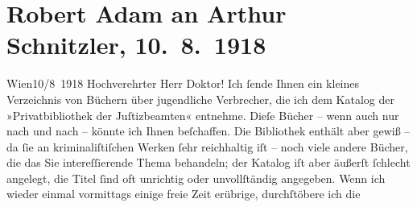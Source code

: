 

         
         \renewcommand{\erwaehntePersonen}{Personen: Robert Adam}
         \renewcommand{\erwaehnteInstitutionen}{Institutionen: Privatbibliothek der Wiener Justizbeamten}
         \renewcommand{\erwaehnteOrte}{Orte: Wien}
         \renewcommand{\erwaehnteWerke}{}
               \section[Robert Adam an Arthur Schnitzler, 10. 8. 1918]{ Robert Adam an Arthur Schnitzler, 10. 8. 1918}\nopagebreak{}\rehead{ }\begin{ledgroupsized}[t]{13cm}\normalsize\beginnumbering{} \toendnotes[C]{\smallbreak\pagebreak[2]} 
\toendnotes[C]{\smallbreak}\pstart
           \centering{}{\pb}Wien10/8 1918\pend
           \pstart\center{}Hochverehrter Herr Doktor!\pend\pstart
           Ich ſende Ihnen ein kleines Verzeichnis von Büchern über jugendliche Verbrecher, die
               ich dem Katalog der »Privatbibliothek der
                  Juſtizbeamten« entnehme. Dieſe Bücher – wenn auch nur nach und nach – könnte
               ich Ihnen beſchaffen. Die Bibliothek enthält aber gewiß – da ſie an kriminaliſtiſchen Werken ſehr
               reichhaltig iſt – noch viele andere Bücher, die das Sie intereſſierende Thema
               behandeln; der Katalog iſt aber äußerſt ſchlecht angelegt, die Titel ſind oft
               unrichtig oder {\pb}unvollſtändig angegeben.
               Wenn ich wieder einmal vormittags einige freie Zeit erübrige, durchſtöbere ich die

\end{ledgroupsized}
